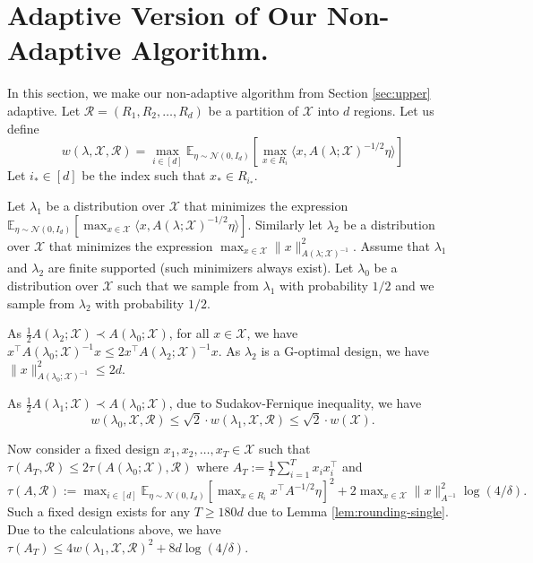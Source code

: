 \section{Adaptive Version of Our Non-Adaptive Algorithm.}\label{appendix:adaptive-version}
In this section, we make our non-adaptive algorithm from Section \ref{sec:upper} adaptive.
Let $\mathcal{R}=(R_1,R_2,\ldots,R_d)$ be a partition of $\mathcal{X}$ into $d$ regions. Let us define 
\[
w(\lambda,\mathcal{X},\mathcal{R})=\max_{i\in[d]}\mathbb{E}_{\eta\sim\mathcal{N}(0,I_d)}\left[\max_{x\in R_i}\langle x, A(\lambda ;\mathcal{X})^{-1/2}\eta\rangle\right]
\]
Let $i_*\in[d]$ be the index such that $x_*\in R_{i_*}$.

Let $\lambda_1$ be a distribution over $\mathcal{X}$ that minimizes the expression $\mathbb{E}_{\eta\sim\mathcal{N}(0,I_d)}[\max_{x\in\mathcal{X}}\langle x, A(\lambda ;\mathcal{X})^{-1/2}\eta\rangle]$. Similarly let $\lambda_2$ be a distribution over $\mathcal{X}$ that minimizes the expression $\max_{x\in\mathcal{X}}\|x\|^2_{A(\lambda;\mathcal{X})^{-1}}$. Assume that $\lambda_1$ and $\lambda_2$ are finite supported (such minimizers always exist).  Let $\lambda_0$ be a distribution over $\mathcal{X}$ such that we sample from $\lambda_1$ with probability $1/2$ and we sample from $\lambda_2$ with probability $1/2$. 


As $\frac{1}{2}A(\lambda_2;\mathcal{X})\prec A(\lambda_0;\mathcal{X})$, for all $x\in \mathcal{X}$, we have $x^\top A(\lambda_0;\mathcal{X})^{-1} x\leq 2x^\top A(\lambda_2;\mathcal{X})^{-1} x $. As $\lambda_2$ is a G-optimal design, we have $\|x\|^2_{A(\lambda_0;\mathcal{X})^{-1}}\leq 2d$. 

As $\frac{1}{2}A(\lambda_1;\mathcal{X})\prec A(\lambda_0;\mathcal{X})$, due to Sudakov-Fernique inequality, we have
\[
w(\lambda_0,\mathcal{X},\mathcal{R})\leq \sqrt{2}\cdot w(\lambda_1,\mathcal{X},\mathcal{R})\leq \sqrt{2}\cdot w(\mathcal{X}).
\]

Now consider a fixed design $x_1,x_2,\ldots,x_T\in \mathcal{X}$ such that $\tau(A_T,\mathcal{R})\leq 2\tau(A(\lambda_0;\mathcal{X}),\mathcal{R})$ where $A_T:=\frac{1}{T}\sum_{i=1}^T x_ix_i^\top$ and $\tau(A,\mathcal{R}):=\max_{i\in[d]}\mathbb{E}_{\eta\sim\mathcal{N}(0,I_d)}\left[\max_{x\in R_i}x^\top A^{-1/2}\eta\right]^2+2\max_{x\in\mathcal{X}}\|x\|_{A^{-1}}^2\log(4/\delta).$ Such a fixed design exists for any $T\geq 180d$ due to Lemma \ref{lem:rounding-single}. Due to the calculations above, we have $\tau(A_T)\leq 4 w(\lambda_1,\mathcal{X},\mathcal{R})^2+8d\log(4/\delta)$.


